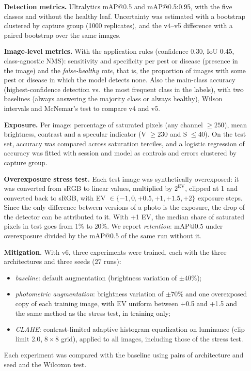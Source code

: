\documentclass[sensors,article,submit,pdftex,moreauthors]{Definitions/mdpi}
\begin{document}
{\color{blue} \textbf{Detection metrics.} Ultralytics mAP@0.5 and mAP@0.5:0.95, with the five classes and without the healthy leaf.} {\color{blue} Uncertainty was estimated with a bootstrap clustered by capture group (1000 replicates), and the v4--v5 difference with a paired bootstrap over the same images.}

{\color{blue} \textbf{Image-level metrics.} With the application rules (confidence 0.30, IoU 0.45, class-agnostic NMS): sensitivity and specificity per pest or disease (presence in the image) and the \emph{false-healthy rate}, that is, the proportion of images with some pest or disease in which the model detects none.} {\color{blue} Also the main-class accuracy (highest-confidence detection vs.\ the most frequent class in the labels), with two baselines (always answering the majority class or always healthy), Wilson intervals and McNemar's test to compare v4 and v5.}

{\color{blue} \textbf{Exposure.} Per image: percentage of saturated pixels (any channel $\geq 250$), mean brightness, contrast and a specular indicator (V $\geq 230$ and S $\leq 40$).} {\color{blue} On the test set, accuracy was compared across saturation terciles, and a logistic regression of accuracy was fitted with session and model as controls and errors clustered by capture group.}

{\color{blue} \textbf{Overexposure stress test.} Each test image was synthetically overexposed: it was converted from sRGB to linear values, multiplied by $2^{\mathrm{EV}}$, clipped at 1 and converted back to sRGB, with EV $\in \{-1, 0, +0.5, +1, +1.5, +2\}$ exposure steps.} {\color{blue} Since the only difference between versions of a photo is the exposure, the drop of the detector can be attributed to it.} {\color{blue} With +1 EV, the median share of saturated pixels in test goes from 1\% to 20\%.} {\color{blue} We report \emph{retention}: mAP@0.5 under overexposure divided by the mAP@0.5 of the same run without it.}

{\color{blue} \textbf{Mitigation.} With v6, three experiments were trained, each with the three architectures and three seeds (27 runs):}
{\color{blue}
\begin{itemize}[leftmargin=*,labelsep=4.9mm]
\item \emph{baseline}: default augmentation (brightness variation of $\pm 40\%$);
\item \emph{photometric augmentation}: brightness variation of $\pm 70\%$ and one overexposed copy of each training image, with EV uniform between +0.5 and +1.5 and the same method as the stress test, in training only;
\item \emph{CLAHE}: contrast-limited adaptive histogram equalization on luminance (clip limit 2.0, $8\times8$ grid), applied to all images, including those of the stress test.
\end{itemize}
Each experiment was compared with the baseline using pairs of architecture and seed and the Wilcoxon test.
}
\end{document}
